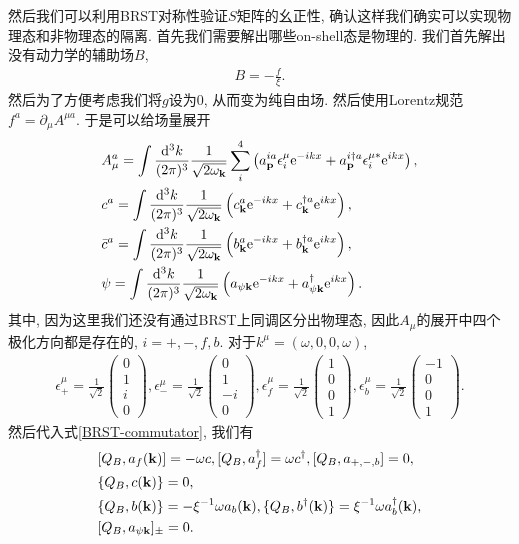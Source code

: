 然后我们可以利用BRST对称性验证$S$矩阵的幺正性, 确认这样我们确实可以实现物理态和非物理态的隔离. 首先我们需要解出哪些on-shell态是物理的. 我们首先解出没有动力学的辅助场$B$, 
\begin{align}
    B=-\frac{f}{\xi}.
\end{align}
然后为了方便考虑我们将$g$设为$0$, 从而变为纯自由场. 然后使用Lorentz规范$f^a=\partial_\mu A^{\mu a}$. 于是可以给场量展开
\begin{align}
    & A_\mu^a=\int\ldsq k\sum_i^4\left(\a p^{ia}\epsilon_i^\mu\exp{-ikx}+\a p^{i\dagger a}\epsilon_i^{\mu*}\exp{ikx}\right),\notag\\
    & c^a=\int\ldsq k\left(\c k^a\exp{-ikx}+\c k^{\dagger a}\exp{ikx}\right),\notag\\
    & \bar c^a=\int\ldsq k\left(\b k^a\exp{-ikx}+\b k^{\dagger a}\exp{ikx}\right),\notag\\
    & \psi=\int\ldsq k\left(a_{\psi\vec k}\exp{-ikx}+a_{\psi\vec k}^\dagger\exp{ikx}\right).
\end{align}
其中, 因为这里我们还没有通过BRST上同调区分出物理态, 因此$A_\mu$的展开中四个极化方向都是存在的, $i=+, -, f, b$. 对于$k^\mu=(\omega, 0, 0, \omega)$, 
\begin{align}
    \epsilon_+^\mu=\frac1{\sqrt2}\begin{pmatrix}
        0 \\
        1\\
        i\\
        0
    \end{pmatrix},
    \epsilon_-^\mu=\frac1{\sqrt2}\begin{pmatrix}
        0 \\
        1\\
        -i\\
        0
    \end{pmatrix},
    \epsilon_f^\mu=\frac1{\sqrt2}\begin{pmatrix}
        1 \\
        0\\
        0\\
        1
    \end{pmatrix},
    \epsilon_b^\mu=\frac1{\sqrt2}\begin{pmatrix}
        -1 \\
        0\\
        0\\
        1
    \end{pmatrix}.
\end{align}
然后代入式\eqref{BRST-commutator}, 我们有
\begin{align}
    & [Q_B, a_f(\vec k)]=-\omega c, [Q_B, a^\dagger_f]=\omega c^\dagger, [Q_B, a_{+, -, b}]=0,\notag\\
    & \{Q_B, c(\vec k)\}=0,\notag\\
    & \{Q_B, b(\vec k)\}=-\xi^{-1}\omega a_{b}(\vec k), \{Q_B, b^\dagger(\vec k)\}=\xi^{-1}\omega a_{b}^\dagger(\vec k),\notag\\
    & [Q_B, a_{\psi\vec k}]_{\pm}=0.
\end{align}

